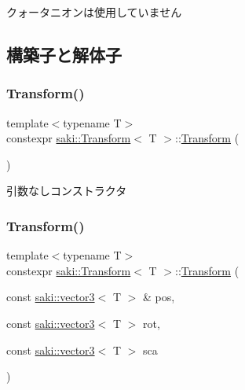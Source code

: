 クォータニオンは使用していません 

\subsection{構築子と解体子}
\mbox{\label{classsaki_1_1_transform_abdd7b5f310bccc56b804a2cf21890a35}} 
\subsubsection{\texorpdfstring{Transform()}{Transform()}\hspace{0.1cm}{\footnotesize\ttfamily [1/4]}}
{\footnotesize\ttfamily template$<$typename T$>$ \\
constexpr \mbox{\hyperlink{classsaki_1_1_transform}{saki\+::\+Transform}}$<$ T $>$\+::\mbox{\hyperlink{classsaki_1_1_transform}{Transform}} (\begin{DoxyParamCaption}{ }\end{DoxyParamCaption})\hspace{0.3cm}{\ttfamily [inline]}}



引数なしコンストラクタ 

\mbox{\label{classsaki_1_1_transform_af4e613f2061daaa30c18aa7b708325a5}} 
\subsubsection{\texorpdfstring{Transform()}{Transform()}\hspace{0.1cm}{\footnotesize\ttfamily [2/4]}}
{\footnotesize\ttfamily template$<$typename T$>$ \\
constexpr \mbox{\hyperlink{classsaki_1_1_transform}{saki\+::\+Transform}}$<$ T $>$\+::\mbox{\hyperlink{classsaki_1_1_transform}{Transform}} (\begin{DoxyParamCaption}\item[{const \mbox{\hyperlink{classsaki_1_1vector3}{saki\+::vector3}}$<$ T $>$ \&}]{pos,  }\item[{const \mbox{\hyperlink{classsaki_1_1vector3}{saki\+::vector3}}$<$ T $>$}]{rot,  }\item[{const \mbox{\hyperlink{classsaki_1_1vector3}{saki\+::vector3}}$<$ T $>$}]{sca }\end{DoxyParamCaption})\hspace{0.3cm}{\ttfamily [inline]}}



